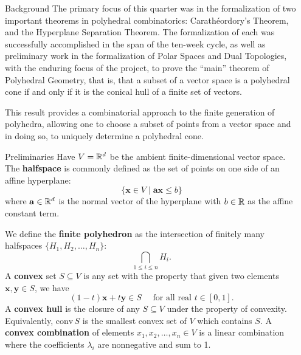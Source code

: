 \documentclass[final]{beamer}
\newlength{\sepwidth}
\newlength{\colwidth}
\newcommand{\separatorcolumn}{\begin{column}{\sepwidth}\end{column}}
\begin{document}
\begin{frame}[fragile]
    \begin{columns}[t]
        \separatorcolumn

        \begin{column}{\colwidth}

            \begin{block}{Background}    
                The primary focus of this quarter was in the formalization of two important theorems in polyhedral combinatorics: Carath\'eordory's Theorem, and the Hyperplane Separation Theorem. The formalization of each was successfully accomplished in the span of the ten-week cycle, as well as preliminary work in the formalization of Polar Spaces and Dual Topologies, with the enduring focus of the project, to prove the ``main'' theorem of Polyhedral Geometry, that is, that a subset of a vector space is a polyhedral cone if and only if it is the conical hull of a finite set of vectors.

                This result provides a combinatorial approach to the finite generation of polyhedra, allowing one to choose a subset of points from a vector space and in doing so, to uniquely determine a polyhedral cone.
            \end{block}

            \begin{block}{Preliminaries}
                Have $V = \mathbb{R}^d$ be the ambient finite-dimensional vector space. The \textbf{halfspace} is commonly defined as the set of points on one side of an affine hyperplane:
                $$ \{\mathbf{x} \in V \;|\; \mathbf{ax} \leq b\}$$
                where $\mathbf{a} \in \mathbb{R}^d$ is the normal vector of the hyperplane with $b \in \mathbb{R}$ as the affine constant term.

                We define the \textbf{finite polyhedron} as the intersection of finitely many halfspaces $\{H_1,H_2,\dots,H_n\}$:
                $$ \bigcap_{1 \leq i \leq n} H_i. $$
                A \textbf{convex} set $S \subseteq V$ is any set with the property that given two elements $\mathbf{x}, \mathbf{y} \in S$, we have
                $$ (1 - t)\mathbf{x} + t\mathbf{y} \in S \quad \text{ for all real } t \in [0,1].$$
                A \textbf{convex hull} is the closure of any $S \subseteq V$ under the property of convexity. Equivalently, $\text{conv}\,S$ is the smallest convex set of $V$ which contains $S$. A \textbf{convex combination} of elements $x_1,x_2,\dots,x_n \in V$ is a linear combination where the coefficients $\lambda_i$ are nonnegative and sum to 1. 


\end{block}
\end{column}
\end{columns}
\end{frame}
\end{document}
